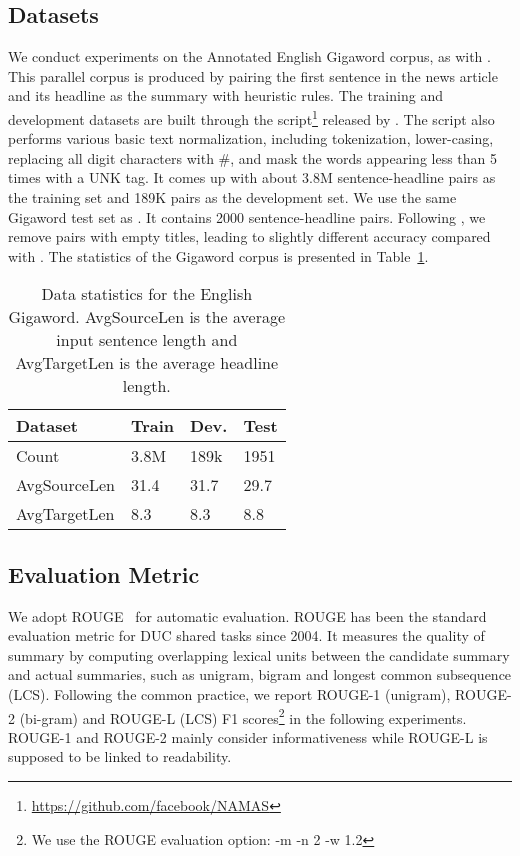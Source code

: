 \documentclass[letterpaper]{article} \usepackage{aaai18}  \usepackage{times}  \usepackage{helvet}  \usepackage{courier}  \usepackage{url}  \usepackage{graphicx}  \usepackage{amsfonts}
\begin{document}
	\subsection{Datasets}
	We conduct experiments on the Annotated English Gigaword corpus, as with \cite{rush-chopra-weston:2015:EMNLP}.
	This parallel corpus is produced by pairing the first sentence in the news article and its headline as the summary with heuristic rules.
	The training and development datasets are built through the script\footnote{\url{https://github.com/facebook/NAMAS}} released
	by \cite{rush-chopra-weston:2015:EMNLP}. 
	The script also performs various basic text normalization, including tokenization, lower-casing, replacing all digit characters with \#, and mask the words appearing less than 5 times with a UNK tag. 
	It comes up with about 3.8M sentence-headline pairs as the training set and 189K pairs as the development set.
	We use the same Gigaword test set as \cite{rush-chopra-weston:2015:EMNLP}.
	It contains 2000 sentence-headline pairs.
	Following \cite{rush2015neural}, we remove pairs with empty titles, leading to slightly different accuracy compared with \cite{rush-chopra-weston:2015:EMNLP}. 
	The statistics of the Gigaword corpus is presented in Table~\ref{tb:dataset}.
	
	\begin{table}[]
		\centering
		\begin{tabular}{l|lll}
			\hline
			Dataset      & Train & Dev. & Test \\ \hline
			Count        & 3.8M  & 189k & 1951 \\
			AvgSourceLen & 31.4  & 31.7 & 29.7     \\
			AvgTargetLen & 8.3   & 8.3  & 8.8     \\ \hline
		\end{tabular}
		\caption{Data statistics for the English Gigaword. AvgSourceLen is the average input sentence length and AvgTargetLen is the average headline length.}
		\label{tb:dataset}
	\end{table}
	
	
	\subsection{Evaluation Metric}
	We adopt ROUGE~\cite{lin2004rouge} for automatic evaluation.
	ROUGE has been the standard evaluation metric for DUC shared tasks since 2004. 
	It measures the quality of summary by computing overlapping lexical units between the candidate summary and actual summaries, such as unigram, bigram and longest common subsequence (LCS). 
	Following the common practice, we report ROUGE-1 (unigram), ROUGE-2 (bi-gram) and ROUGE-L (LCS) F1 scores\footnote{We use the ROUGE evaluation option: -m -n 2 -w 1.2} in the following experiments.
	ROUGE-1 and ROUGE-2 mainly consider informativeness while ROUGE-L is supposed to be linked to readability.
	
\end{document}
